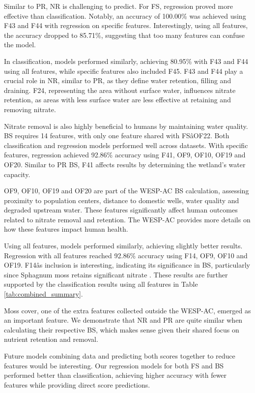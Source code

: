 \documentclass[12pt,letterpaper]{article}
\begin{document}
Similar to \ac{PR}, \ac{NR} is challenging to predict.
For \ac{FS}, regression proved more effective than classification.
Notably, an accuracy of 100.00\% was achieved using F43 and F44 with regression on specific features.
Interestingly, using all features, the accuracy dropped to 85.71\%, suggesting that too many features can confuse the model.

In classification, models performed similarly, achieving 80.95\% with F43 and F44 using all features, while specific features also included F45.
F43 and F44 play a crucial role in \ac{NR}, similar to \ac{PR}, as they define water retention, filling and draining.
F24, representing the area without surface water, influences nitrate retention, as areas with less surface water are less effective at retaining and removing nitrate.

Nitrate removal is also highly beneficial to humans by maintaining water quality.
\ac{BS} requires 14 features, with only one feature shared with \ac{FS}âOF22.
Both classification and regression models performed well across datasets.
With specific features, regression achieved 92.86\% accuracy using F41, OF9, OF10, OF19 and OF20.
Similar to \ac{PR} \ac{BS}, F41 affects results by determining the wetland's water capacity.

OF9, OF10, OF19 and OF20 are part of the WESP-AC \ac{BS} calculation, assessing proximity to population centers, distance to domestic wells, water quality and degraded upstream water.
These features significantly affect human outcomes related to nitrate removal and retention.
The WESP-AC provides more details on how these features impact human health.

Using all features, models performed similarly, achieving slightly better results.
Regression with all features reached 92.86\% accuracy using F14, OF9, OF10 and OF19.
F14âs inclusion is interesting, indicating its significance in \ac{BS}, particularly since Sphagnum moss retains significant nitrate \cite{williams1999nitrogen}.
These results are further supported by the classification results using all features in Table \ref{tab:combined_summary}.

Moss cover, one of the extra features collected outside the WESP-AC, emerged as an important feature.
We demonstrate that \ac{NR} and \ac{PR} are quite similar when calculating their respective \ac{BS}, which makes sense given their shared focus on nutrient retention and removal.

Future models combining data and predicting both scores together to reduce features would be interesting.
Our regression models for both \ac{FS} and \ac{BS} performed better than classification, achieving higher accuracy with fewer features while providing direct score predictions.
\end{document}
